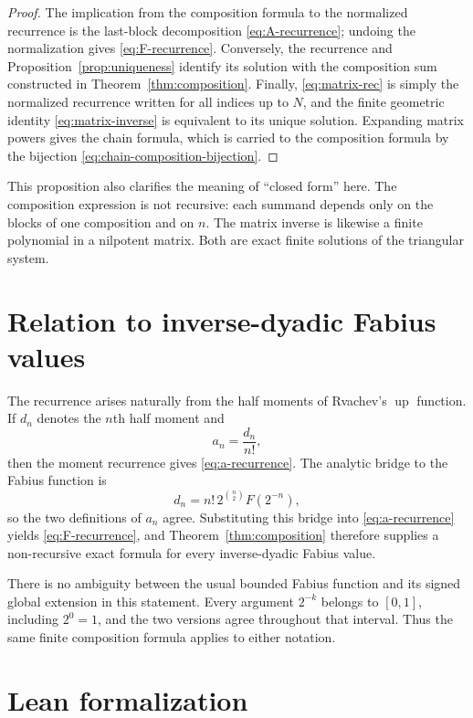 \documentclass[11pt]{article}
\theoremstyle{definition}
\theoremstyle{remark}
\begin{document}
\begin{proof}
The implication from the composition formula to the normalized recurrence is
the last-block decomposition \eqref{eq:A-recurrence}; undoing the
normalization gives \eqref{eq:F-recurrence}.  Conversely, the recurrence and
Proposition~\ref{prop:uniqueness} identify its solution with the composition
sum constructed in Theorem~\ref{thm:composition}.  Finally,
\eqref{eq:matrix-rec} is simply the normalized recurrence written for all
indices up to $N$, and the finite geometric identity
\eqref{eq:matrix-inverse} is equivalent to its unique solution.  Expanding
matrix powers gives the chain formula, which is carried to the composition
formula by the bijection \eqref{eq:chain-composition-bijection}.
\end{proof}

This proposition also clarifies the meaning of ``closed form'' here.  The
composition expression is not recursive: each summand depends only on the
blocks of one composition and on $n$.  The matrix inverse is likewise a
finite polynomial in a nilpotent matrix.  Both are exact finite solutions of
the triangular system.

\section{Relation to inverse-dyadic Fabius values}

The recurrence arises naturally from the half moments of Rvachev's
$\operatorname{up}$ function.  If $d_n$ denotes the $n$th half moment and
\[
 a_n=\frac{d_n}{n!},
\]
then the moment recurrence gives \eqref{eq:a-recurrence}.  The analytic
bridge to the Fabius function is
\[
 d_n=n!\,2^{\binom n2}F(2^{-n}),
\]
so the two definitions of $a_n$ agree.  Substituting this bridge into
\eqref{eq:a-recurrence} yields \eqref{eq:F-recurrence}, and
Theorem~\ref{thm:composition} therefore supplies a non-recursive exact
formula for every inverse-dyadic Fabius value.

There is no ambiguity between the usual bounded Fabius function and its
signed global extension in this statement.  Every argument $2^{-k}$ belongs
to $[0,1]$, including $2^0=1$, and the two versions agree throughout that
interval.  Thus the same finite composition formula applies to either
notation.

\section{Lean formalization}
\end{document}
